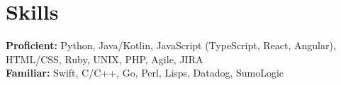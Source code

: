 \documentclass[10pt, a4paper]{article}
\begin{document}
\vspace{-7mm}
\section*{Skills}
\textbf{Proficient:} Python, Java/Kotlin, JavaScript (TypeScript, React, Angular), HTML/CSS, Ruby, UNIX, PHP, Agile, JIRA\\
\textbf{Familiar:} Swift, C/C++, Go, Perl, Lisps, Datadog, SumoLogic\\
\end{document}
